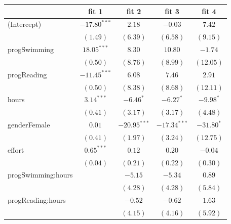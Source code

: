 \documentclass[
]{article}
\begin{document}
\begin{table}
\begin{center}
\begin{tabular}{l c c c c}
\hline
 & fit 1 & fit 2 & fit 3 & fit 4 \\
\hline
(Intercept)                            & $-17.80^{***}$ & $2.18$         & $-0.03$        & $7.42$        \\
                                       & $(1.49)$       & $(6.39)$       & $(6.58)$       & $(9.15)$      \\
progSwimming                           & $18.05^{***}$  & $8.30$         & $10.80$        & $-1.74$       \\
                                       & $(0.50)$       & $(8.76)$       & $(8.99)$       & $(12.05)$     \\
progReading                            & $-11.45^{***}$ & $6.08$         & $7.46$         & $2.91$        \\
                                       & $(0.50)$       & $(8.38)$       & $(8.68)$       & $(12.11)$     \\
hours                                  & $3.14^{***}$   & $-6.46^{*}$    & $-6.27^{*}$    & $-9.98^{*}$   \\
                                       & $(0.41)$       & $(3.17)$       & $(3.17)$       & $(4.48)$      \\
genderFemale                           & $0.01$         & $-20.95^{***}$ & $-17.34^{***}$ & $-31.80^{*}$  \\
                                       & $(0.41)$       & $(1.97)$       & $(3.24)$       & $(12.75)$     \\
effort                                 & $0.65^{***}$   & $0.12$         & $0.20$         & $-0.04$       \\
                                       & $(0.04)$       & $(0.21)$       & $(0.22)$       & $(0.30)$      \\
progSwimming:hours                     &                & $-5.15$        & $-5.34$        & $0.89$        \\
                                       &                & $(4.28)$       & $(4.28)$       & $(5.84)$      \\
progReading:hours                      &                & $-0.52$        & $-0.62$        & $1.63$        \\
                                       &                & $(4.15)$       & $(4.16)$       & $(5.92)$      \\

\end{tabular}
\end{center}
\end{table}
\end{document}
